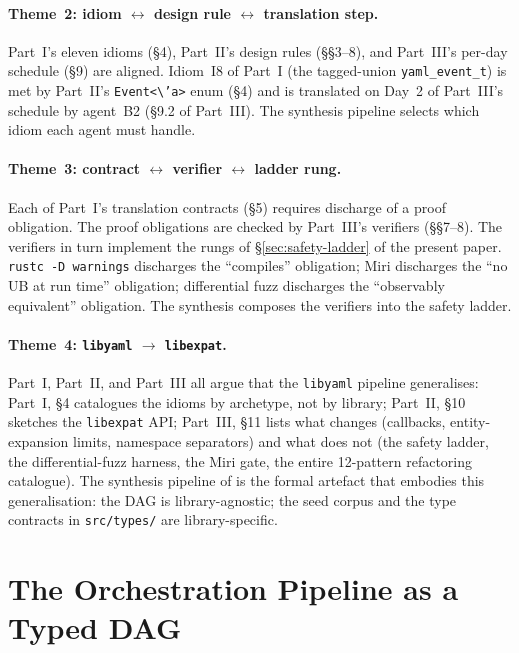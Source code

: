 \documentclass[12pt]{article}
\theoremstyle{definition}
\theoremstyle{remark}
\newcommand{\libyaml}{\texttt{libyaml}}
\newcommand{\libexpat}{\texttt{libexpat}}
\begin{document}
\paragraph{Theme~2: idiom $\leftrightarrow$ design rule
$\leftrightarrow$ translation step.} Part~I's eleven idioms (\S{}4),
Part~II's design rules (\S{}\S{}3--8), and Part~III's per-day
schedule (\S{}9) are aligned. Idiom~I8 of Part~I (the tagged-union
\texttt{yaml\_event\_t}) is met by Part~II's
\texttt{Event<\textbackslash 'a>} enum (\S{}4) and is translated on
Day~2 of Part~III's schedule by agent~B2 (\S{}9.2 of Part~III). The
synthesis pipeline selects which idiom each agent must handle.

\paragraph{Theme~3: contract $\leftrightarrow$ verifier
$\leftrightarrow$ ladder rung.} Each of Part~I's translation contracts
(\S{}5) requires discharge of a proof obligation. The proof
obligations are checked by Part~III's verifiers (\S{}\S{}7--8). The
verifiers in turn implement the rungs of \S{}\ref{sec:safety-ladder}
of the present paper. \texttt{rustc -D warnings} discharges the
``compiles'' obligation; Miri discharges the ``no UB at run time''
obligation; differential fuzz discharges the ``observably equivalent''
obligation. The synthesis composes the verifiers into the safety
ladder.

\paragraph{Theme~4: \libyaml{} $\to$ \libexpat{}.} Part~I, Part~II,
and Part~III all argue that the \libyaml{} pipeline generalises:
Part~I, \S{}4 catalogues the idioms by archetype, not by library;
Part~II, \S{}10 sketches the \libexpat{} API; Part~III, \S{}11 lists
what changes (callbacks, entity-expansion limits, namespace separators)
and what does not (the safety ladder, the differential-fuzz harness,
the Miri gate, the entire 12-pattern refactoring catalogue). The
synthesis pipeline of  is the formal artefact that
embodies this generalisation: the DAG is library-agnostic; the seed
corpus and the type contracts in \texttt{src/types/} are
library-specific.

\section{The Orchestration Pipeline as a Typed DAG}
\label{sec:dag}
\end{document}
